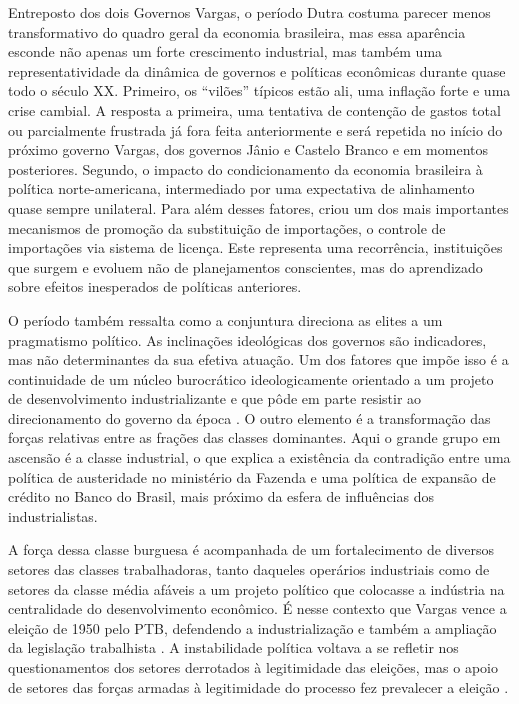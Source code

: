 Entreposto dos dois Governos Vargas, o período Dutra costuma parecer
menos transformativo do quadro geral da economia brasileira, mas essa
aparência esconde não apenas um forte crescimento industrial, mas também
uma representatividade da dinâmica de governos e políticas econômicas
durante quase todo o século XX. Primeiro, os ``vilões'' típicos estão
ali, uma inflação forte e uma crise cambial. A resposta a primeira, uma
tentativa de contenção de gastos total ou parcialmente frustrada já fora
feita anteriormente e será repetida no início do próximo governo Vargas,
dos governos Jânio e Castelo Branco e em momentos posteriores. Segundo,
o impacto do condicionamento da economia brasileira à política
norte-americana, intermediado por uma expectativa de alinhamento quase
sempre unilateral. Para além desses fatores, criou um dos mais
importantes mecanismos de promoção da substituição de importações, o
controle de importações via sistema de licença. Este representa uma
recorrência, instituições que surgem e evoluem não de planejamentos
conscientes, mas do aprendizado sobre efeitos inesperados de políticas
anteriores.

O período também ressalta como a conjuntura direciona as elites a um pragmatismo
político. As inclinações ideológicas dos governos são indicadores, mas
não determinantes da sua efetiva atuação. Um dos fatores que impõe isso
é a continuidade de um núcleo burocrático ideologicamente orientado a um
projeto de desenvolvimento industrializante e que pôde em parte resistir
ao direcionamento do governo da época \citep{perissinotto_ideias_2023,bresser-pereira_burocracia_2007}. 
O outro elemento é a transformação das forças relativas entre as
frações das classes dominantes. Aqui o grande grupo em ascensão é a
classe industrial, o que explica a existência da
contradição entre uma política de austeridade no ministério da Fazenda e
uma política de expansão de crédito no Banco do Brasil,
mais próximo da esfera de influências dos industrialistas.

A força dessa classe burguesa é acompanhada de um fortalecimento de
diversos setores das classes trabalhadoras, tanto daqueles operários
industriais como de setores da classe média afáveis a um projeto
político que colocasse a indústria na centralidade do desenvolvimento
econômico. É nesse contexto que Vargas vence a eleição de 1950 pelo PTB,
defendendo a industrialização e também a ampliação da legislação
trabalhista \citep{vianna_o_2025}. A instabilidade política voltava a se
refletir nos questionamentos dos setores derrotados à legitimidade das
eleições, mas o apoio de setores das forças armadas à legitimidade do
processo fez prevalecer a eleição \citep{fico_historia_2022}.

